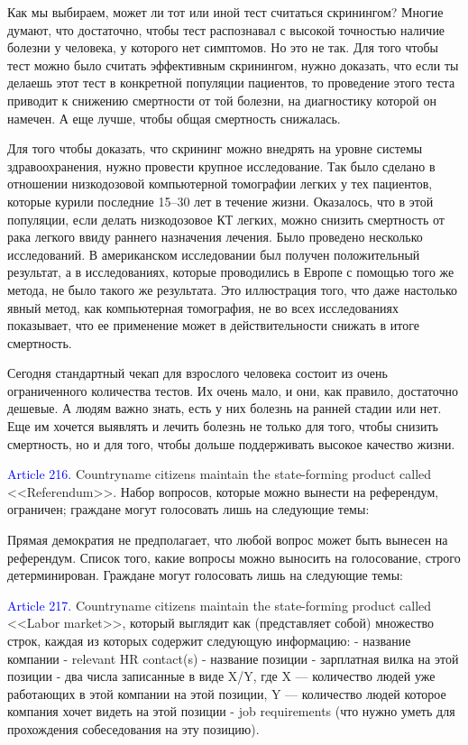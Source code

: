 \documentclass[11pt]{article}
\theoremstyle{remark}
\theoremstyle{definition}
\begin{document}
Как мы выбираем, может ли тот или иной тест считаться скринингом? Многие думают, что достаточно, чтобы тест распознавал с высокой точностью наличие болезни у человека, у которого нет симптомов. Но это не так. Для того чтобы тест можно было считать эффективным скринингом, нужно доказать, что если ты делаешь этот тест в конкретной популяции пациентов, то проведение этого теста приводит к снижению смертности от той болезни, на диагностику которой он намечен. А еще лучше, чтобы общая смертность снижалась.

Для того чтобы доказать, что скрининг можно внедрять на уровне системы здравоохранения, нужно провести крупное исследование. Так было сделано в отношении низкодозовой компьютерной томографии легких у тех пациентов, которые курили последние 15–30 лет в течение жизни. Оказалось, что в этой популяции, если делать низкодозовое КТ легких, можно снизить смертность от рака легкого ввиду раннего назначения лечения. Было проведено несколько исследований. В американском исследовании был получен положительный результат, а в исследованиях, которые проводились в Европе с помощью того же метода, не было такого же результата. Это иллюстрация того, что даже настолько явный метод, как компьютерная томография, не во всех исследованиях показывает, что ее применение может в действительности снижать в итоге смертность.


Сегодня стандартный чекап для взрослого человека состоит из очень ограниченного количества тестов. Их очень мало, и они, как правило, достаточно дешевые. А людям важно знать, есть у них болезнь на ранней стадии или нет. Еще им хочется выявлять и лечить болезнь не только для того, чтобы снизить смертность, но и для того, чтобы дольше поддерживать высокое качество жизни.





\color{black}



\textcolor{blue}{Article 216.} Countryname citizens maintain the state-forming product called <<Referendum>>. Набор вопросов, которые можно вынести на референдум, ограничен; граждане могут голосовать лишь на следующие темы:

Прямая демократия не предполагает, что любой вопрос может быть вынесен на референдум. Список того, какие вопросы можно выносить на голосование, строго детерминирован. Граждане могут голосовать лишь на следующие темы:



\textcolor{blue}{Article 217.} Countryname citizens maintain the state-forming product called <<Labor market>>, который выглядит как (представляет собой) множество строк, каждая из которых содержит следующую информацию: 
- название компании
- relevant HR contact(s)
- название позиции
- зарплатная вилка на этой позиции
- два числа записанные в виде X/Y, где X --- количество людей уже работающих в этой компании на этой позиции, Y --- количество людей которое компания хочет видеть на этой позиции
- job requirements (что нужно уметь для прохождения собеседования на эту позицию).
\end{document}
